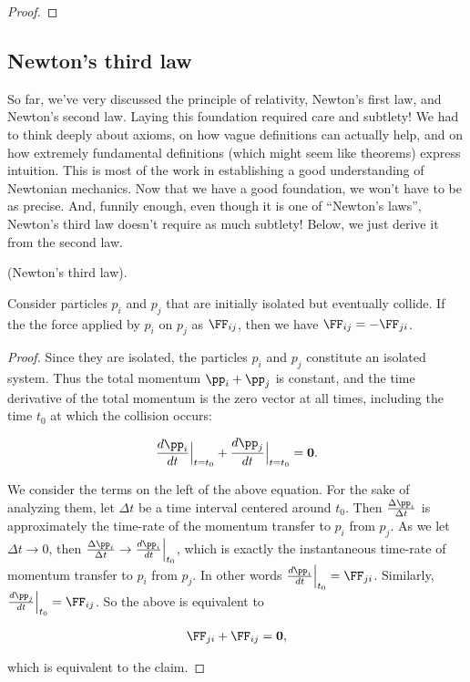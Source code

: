 \documentclass{article}
\begin{document}
\begin{proof}
\end{proof}

\subsection*{Newton's third law}

So far, we've very discussed the principle of relativity, Newton's first law, and Newton's second law. Laying this foundation required care and subtlety! We had to think deeply about axioms, on how vague definitions can actually help, and on how extremely fundamental definitions (which might seem like theorems) express intuition. This is most of the work in establishing a good understanding of Newtonian mechanics. Now that we have a good foundation, we won't have to be as precise. And, funnily enough, even though it is one of ``Newton's laws'', Newton's third law doesn't require as much subtlety! Below, we just derive it from the second law.

\begin{theorem}
    (Newton's third law).

    Consider particles $p_i$ and $p_j$ that are initially isolated but eventually collide. If the the force applied by $p_i$ on $p_j$ as $\FF_{ij}$, then we have $\FF_{ij} = -\FF_{ji}$.
\end{theorem}

\begin{proof}
    Since they are isolated, the particles $p_i$ and $p_j$  constitute an isolated system. Thus the total momentum $\pp_i + \pp_j$ is constant, and the time derivative of the total momentum is the zero vector at all times, including the time $t_0$ at which the collision occurs:

    \begin{align*}
        \frac{d\pp_i}{dt}\Big|_{t = t_0} + \frac{d\pp_j}{dt}\Big|_{t = t_0} = \mathbf{0}.
    \end{align*}

    We consider the terms on the left of the above equation. For the sake of analyzing them, let $\Delta t$ be a time interval centered around $t_0$. Then $\frac{\Delta \pp_i}{\Delta t}$ is approximately the time-rate of the momentum transfer to $p_i$ from $p_j$. As we let $\Delta t \rightarrow 0$, then $\frac{\Delta \pp_i}{\Delta t} \rightarrow \frac{d\pp_i}{dt}\Big|_{t_0}$, which is exactly the instantaneous time-rate of momentum transfer to $p_i$ from $p_j$. In other words $\frac{d\pp_i}{dt}\Big|_{t_0} = \FF_{ji}$. Similarly, $\frac{d\pp_j}{dt}\Big|_{t_0} = \FF_{ij}$. So the above is equivalent to

    \begin{align*}
        \FF_{ji} + \FF_{ij} = \mathbf{0},
    \end{align*}

    which is equivalent to the claim.
\end{proof}
\end{document}
